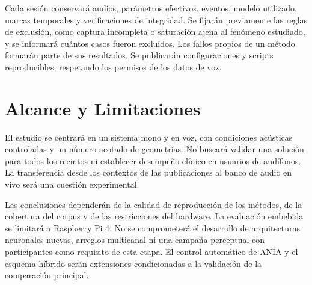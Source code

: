 Cada sesión conservará audios, parámetros efectivos, eventos, modelo utilizado, marcas temporales y verificaciones de integridad. Se fijarán previamente las reglas de exclusión, como captura incompleta o saturación ajena al fenómeno estudiado, y se informará cuántos casos fueron excluidos. Los fallos propios de un método formarán parte de sus resultados. Se publicarán configuraciones y scripts reproducibles, respetando los permisos de los datos de voz.

\section{Alcance y Limitaciones}
El estudio se centrará en un sistema mono y en voz, con condiciones acústicas controladas y un número acotado de geometrías. No buscará validar una solución para todos los recintos ni establecer desempeño clínico en usuarios de audífonos. La transferencia desde los contextos de las publicaciones al banco de audio en vivo será una cuestión experimental.

Las conclusiones dependerán de la calidad de reproducción de los métodos, de la cobertura del corpus y de las restricciones del hardware. La evaluación embebida se limitará a Raspberry Pi 4. No se comprometerá el desarrollo de arquitecturas neuronales nuevas, arreglos multicanal ni una campaña perceptual con participantes como requisito de esta etapa. El control automático de ANIA y el esquema híbrido serán extensiones condicionadas a la validación de la comparación principal.
